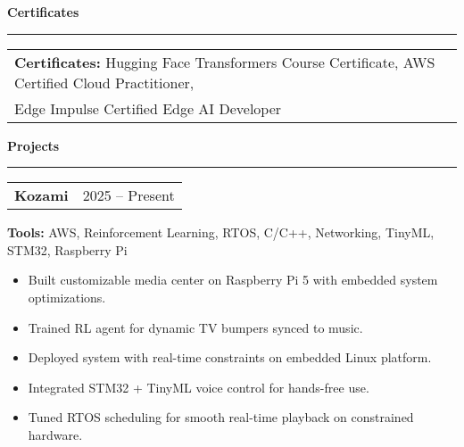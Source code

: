\documentclass[a4paper,10pt]{article}
\begin{document}
\vspace{0.1in}
\textbf{Certificates}
\vspace{0.05in}
\hrule
\vspace{0.15in}

\begin{tabularx}{\textwidth}{@{}X@{}}
\noindent\textbf{Certificates:} Hugging Face Transformers Course Certificate, AWS Certified Cloud Practitioner,\\ Edge Impulse Certified Edge AI Developer
\end{tabularx}

\vspace{0.1in}
\textbf{Projects}
\vspace{0.05in}
\hrule
\vspace{0.05in}

\begin{tabularx}{\textwidth}{@{} X r @{}}
\textbf{Kozami} & 2025 -- Present \\
\end{tabularx}
\vspace{-4pt}
\noindent\textbf{Tools:} AWS, Reinforcement Learning, RTOS, C/C++, Networking, TinyML, STM32, Raspberry Pi
\vspace{0.1in}
\begin{itemize}[leftmargin=*, nosep]
  \item Built customizable media center on Raspberry Pi 5 with embedded system optimizations.
  \item Trained RL agent for dynamic TV bumpers synced to music.
  \item Deployed system with real-time constraints on embedded Linux platform.
  \item Integrated STM32 + TinyML voice control for hands-free use.
  \item Tuned RTOS scheduling for smooth real-time playback on constrained hardware.
\end{itemize}


\newpage

\vspace{-2pt}


\end{document}
